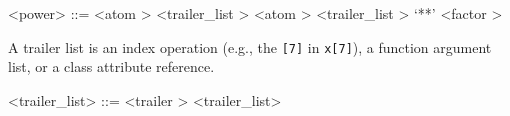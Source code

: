 
\label{powerb}

\begin{grammar}
<power> ::= <atom \myref[atomb]> <trailer_list \myref[trailerzzzlistb]>
	\alt <atom \myref[atomb]> <trailer_list \myref[trailerzzzlistb]> `**' <factor \myref[factorb]>
\end{grammar}


A trailer list is an index operation (e.g., the \verb|[7]| in \verb|x[7]|), a function argument list, or a class attribute reference.

\label{trailerzzzlistb}

\begin{grammar}
<trailer_list> ::= \greeke
	\alt <trailer \myref[trailerb]> <trailer_list>
\end{grammar}


\label{trailerb}

